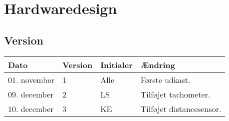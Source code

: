 \chapter{Hardwaredesign}
\section*{Version}
\begin{table}[h]
	\centering
	\begin{tabularx}{\textwidth - 2cm}{|l|l|l|X|}
	\hline
	Dato			& Version			& Initialer 		& Ændring										\\ \hline
	01. november 			& 1 				& Alle				& Første udkast. 						\\ \hline
	09. december 			& 2 				& LS				& Tilføjet tachometer.					\\ \hline
	10. december 			& 3 				& KE				& Tilføjet distancesensor.				\\ \hline

	\end{tabularx}
\end{table}
\clearpage




